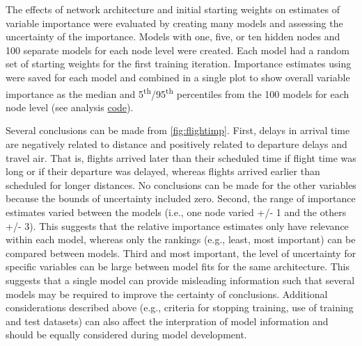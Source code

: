 \documentclass[article,shortnames]{jss}
\begin{document}
The effects of network architecture and initial starting weights on estimates of variable importance were evaluated by creating many models and assessing the uncertainty of the importance.  Models with one, five, or ten hidden nodes and 100 separate models for each node level were created.  Each model had a random set of starting weights for the first training iteration.  Importance estimates using  were saved for each model and combined in a single plot to show overall variable importance as the median and 5\textsuperscript{th}/95\textsuperscript{th} percentiles from the 100 models for each node level (see analysis \href{https://raw.githubusercontent.com/fawda123/nnt_manu/master/flightimp.R}{code}). 

Several conclusions can be made from \cref{fig:flightimp}.  First, delays in arrival time are negatively related to distance and positively related to departure delays and travel air.  That is, flights arrived later than their scheduled time if flight time was long or if their departure was delayed, whereas flights arrived earlier than scheduled for longer distances.  No conclusions can be made for the other variables because the bounds of uncertainty included zero.  Second, the range of importance estimates varied between the models (i.e., one node  varied +/- 1 and the others +/- 3).  This suggests that the relative importance estimates only have relevance within each model, whereas only the rankings (e.g., least, most important) can be compared between models.  Third and most important, the level of uncertainty for specific variables can be large between model fits for the same architecture.  This suggests that a single model can provide misleading information such that several models may be required to improve the certainty of conclusions.  Additional considerations described above (e.g., criteria for stopping training, use of training and test datasets) can also affect the interpration of model information and should be equally considered during model development.
\end{document}
